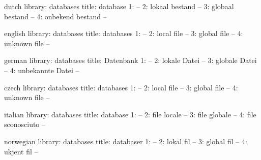 

\startmessages  dutch  library: databases
  title: database
      1: --
      2: lokaal bestand --
      3: globaal bestand --
      4: onbekend bestand --
\stopmessages

\startmessages  english  library: databases
  title: databases
      1: --
      2: local file --
      3: global file --
      4: unknown file --
\stopmessages

\startmessages  german  library: databases
  title: Datenbank
      1: --
      2: lokale Datei --
      3: globale Datei --
      4: unbekannte Datei --
\stopmessages


\startmessages  czech library: databases
  title: databases
      1: --
      2: local file --
      3: global file --
      4: unknown file --
\stopmessages

\startmessages  italian  library: databases
  title: database
      1: --
      2: file locale --
      3: file globale --
      4: file sconosciuto --
\stopmessages

\startmessages  norwegian  library: databases
  title: databaser
      1: --
      2: lokal fil --
      3: global fil --
      4: ukjent fil --
\stopmessages

\unprotect

